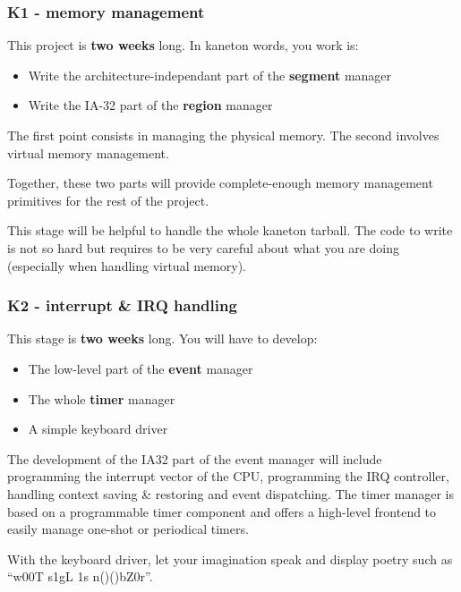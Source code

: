 
\begin{frame}
  \frametitle{K1 - memory management}

  This project is \textbf{two weeks} long. In kaneton words, you work is:

  \begin{itemize}
  \item
    Write the architecture-independant part of the \textbf{segment} manager
  \item
    Write the IA-32 part of the \textbf{region} manager
  \end{itemize}

  \-

  The first point consists in managing the physical memory. The second
  involves virtual memory management.

  Together, these two parts will provide complete-enough memory
  management primitives for the rest of the project.

  \-

  This stage will be helpful to handle the whole kaneton tarball. The
  code to write is not so hard but requires to be very careful about
  what you are doing (especially when handling virtual memory).

\end{frame}


\begin{frame}
  \frametitle{K2 - interrupt \& IRQ handling}

  This stage is \textbf{two weeks} long. You will have to develop:

  \begin{itemize}
  \item
    The low-level part of the \textbf{event} manager
  \item
    The whole \textbf{timer} manager
  \item
    A simple keyboard driver
  \end{itemize}

  \-

  The development of the IA32 part of the event manager will include
  programming the interrupt vector of the CPU, programming the IRQ
  controller, handling context saving \& restoring and event
  dispatching. The timer manager is based on a programmable timer
  component and offers a high-level frontend to easily manage one-shot
  or periodical timers.

  \-

  With the keyboard driver, let your imagination speak and display
  poetry such as ``w00T s1gL 1s n()()bZ0r''.

\end{frame}

